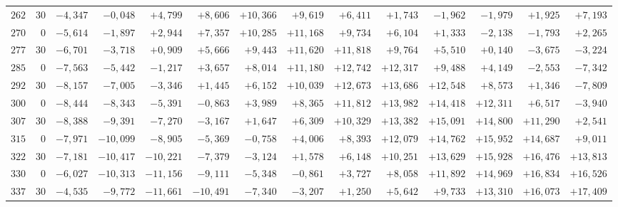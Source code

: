 \begin{landscape}
\begin{longtable}{@{}rr|r|r|r|r|r|r|r|r|r|r|r|r@{}}
\(262\) & \(30\) & \(-4{,}347\) & \(-0{,}048\) & \(+4{,}799\) & \(+8{,}606\) & \(+10{,}366\) & \(+9{,}619\) & \(+6{,}411\) & \(+1{,}743\) & \(-1{,}962\) & \(-1{,}979\) & \(+1{,}925\) & \(+7{,}193\)\\[2pt]
\(270\) & \(0\) & \(-5{,}614\) & \(-1{,}897\) & \(+2{,}944\) & \(+7{,}357\) & \(+10{,}285\) & \(+11{,}168\) & \(+9{,}734\) & \(+6{,}104\) & \(+1{,}333\) & \(-2{,}138\) & \(-1{,}793\) & \(+2{,}265\)\\
\(277\) & \(30\) & \(-6{,}701\) & \(-3{,}718\) & \(+0{,}909\) & \(+5{,}666\) & \(+9{,}443\) & \(+11{,}620\) & \(+11{,}818\) & \(+9{,}764\) & \(+5{,}510\) & \(+0{,}140\) & \(-3{,}675\) & \(-3{,}224\)\\
\(285\) & \(0\) & \(-7{,}563\) & \(-5{,}442\) & \(-1{,}217\) & \(+3{,}657\) & \(+8{,}014\) & \(+11{,}180\) & \(+12{,}742\) & \(+12{,}317\) & \(+9{,}488\) & \(+4{,}149\) & \(-2{,}553\) & \(-7{,}342\)\\
\(292\) & \(30\) & \(-8{,}157\) & \(-7{,}005\) & \(-3{,}346\) & \(+1{,}445\) & \(+6{,}152\) & \(+10{,}039\) & \(+12{,}673\) & \(+13{,}686\) & \(+12{,}548\) & \(+8{,}573\) & \(+1{,}346\) & \(-7{,}809\)\\[2pt]
\(300\) & \(0\) & \(-8{,}444\) & \(-8{,}343\) & \(-5{,}391\) & \(-0{,}863\) & \(+3{,}989\) & \(+8{,}365\) & \(+11{,}812\) & \(+13{,}982\) & \(+14{,}418\) & \(+12{,}311\) & \(+6{,}517\) & \(-3{,}940\)\\
\(307\) & \(30\) & \(-8{,}388\) & \(-9{,}391\) & \(-7{,}270\) & \(-3{,}167\) & \(+1{,}647\) & \(+6{,}309\) & \(+10{,}329\) & \(+13{,}382\) & \(+15{,}091\) & \(+14{,}800\) & \(+11{,}290\) & \(+2{,}541\)\\
\(315\) & \(0\) & \(-7{,}971\) & \(-10{,}099\) & \(-8{,}905\) & \(-5{,}369\) & \(-0{,}758\) & \(+4{,}006\) & \(+8{,}393\) & \(+12{,}079\) & \(+14{,}762\) & \(+15{,}952\) & \(+14{,}687\) & \(+9{,}011\)\\
\(322\) & \(30\) & \(-7{,}181\) & \(-10{,}417\) & \(-10{,}221\) & \(-7{,}379\) & \(-3{,}124\) & \(+1{,}578\) & \(+6{,}148\) & \(+10{,}251\) & \(+13{,}629\) & \(+15{,}928\) & \(+16{,}476\) & \(+13{,}813\)\\[2pt]
\(330\) & \(0\) & \(-6{,}027\) & \(-10{,}313\) & \(-11{,}156\) & \(-9{,}111\) & \(-5{,}348\) & \(-0{,}861\) & \(+3{,}727\) & \(+8{,}058\) & \(+11{,}892\) & \(+14{,}969\) & \(+16{,}834\) & \(+16{,}526\)\\
\(337\) & \(30\) & \(-4{,}535\) & \(-9{,}772\) & \(-11{,}661\) & \(-10{,}491\) & \(-7{,}340\) & \(-3{,}207\) & \(+1{,}250\) & \(+5{,}642\) & \(+9{,}733\) & \(+13{,}310\) & \(+16{,}073\) & \(+17{,}409\)\\

\end{longtable}
\end{landscape}
